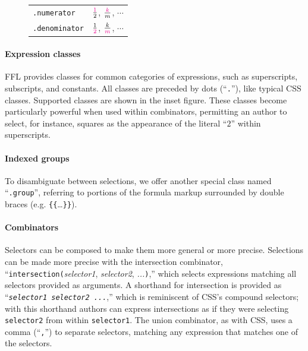 {\begin{figure}
\begin{tabularx}{.54\columnwidth}{l|l}
    \texttt{.numerator}   & $\frac{\textcolor{magenta}{1}}{2}$, $\frac{\textcolor{magenta}{k}}{m}$, $\cdots$ \\[2pt]
    \texttt{.denominator} & $\frac{1}{\textcolor{magenta}{2}}$, $\frac{k}{\textcolor{magenta}{m}}$, $\cdots$ \\
    \end{tabularx}
\end{figure} } 


\paragraph{Expression classes} FFL provides classes for common categories of expressions, such as superscripts, subscripts, and constants. All classes are preceded by dots (``\texttt{.}''), like typical CSS classes. Supported classes are shown in the inset figure. These classes become particularly powerful when used within combinators, permitting an author to select, for instance, squares as the appearance of the literal ``\texttt{$2$}'' within superscripts.

\paragraph{Indexed groups} To disambiguate between selections, we offer another special class named ``\texttt{.group}'', referring to portions of the formula markup surrounded by double braces (e.g. \texttt{\{\{}\dots\texttt{\}\}}). 

\paragraph{Combinators}
Selectors can be composed to make them more general or more precise. Selections can be made more precise with the intersection combinator, ``\texttt{{intersection}(}{\textit{selector1}, \textit{selector2}, \textit{...}}{\texttt{)}},'' which selects expressions matching all selectors provided as arguments. A shorthand for intersection is provided as ``\texttt{\textit{selector1} \textit{selector2} \textit{...}},'' which is reminiscent of CSS's compound selectors; with this shorthand authors can express intersections as if they were selecting \texttt{selector2} from within \texttt{selector1}. The union combinator, as with CSS, uses a comma (``\texttt{,}'') to separate selectors, matching any expression that matches one of the selectors.

